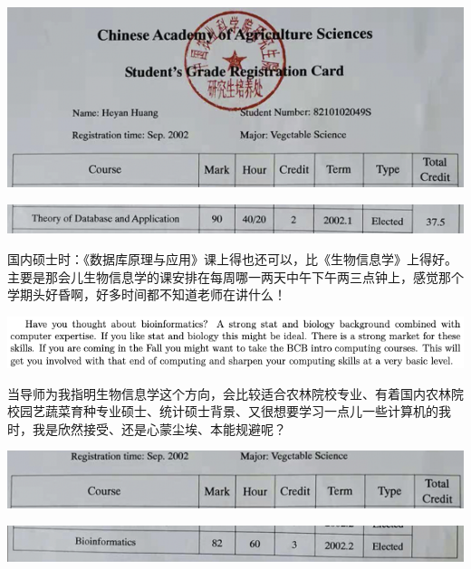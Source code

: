 \documentclass[9pt, b5paper]{article}
\begin{document}
\begin{center}
\includegraphics[width=.9\linewidth]{./pic/backups_plans_20210419_094833.png}
\end{center}

\begin{center}
\includegraphics[width=.9\linewidth]{./pic/backups_plans_20210421_135421.png}
\end{center}

国内硕士时：《数据库原理与应用》课上得也还可以，比《生物信息学》上得好。主要是那会儿生物信息学的课安排在每周哪一两天中午下午两三点钟上，感觉那个学期头好昏啊，好多时间都不知道老师在讲什么！

\begin{center}
\includegraphics[width=.9\linewidth]{./pic/backups_plans_20210421_090620.png}
\end{center}

当导师为我指明生物信息学这个方向，会比较适合农林院校专业、有着国内农林院校园艺蔬菜育种专业硕士、统计硕士背景、又很想要学习一点儿一些计算机的我时，我是欣然接受、还是心蒙尘埃、本能规避呢？

\begin{center}
\includegraphics[width=.9\linewidth]{./pic/backups_plans_20210421_135356.png}
\end{center}

\begin{center}
\includegraphics[width=.9\linewidth]{./pic/backups_plans_20210419_094910.png}
\end{center}
\end{document}
